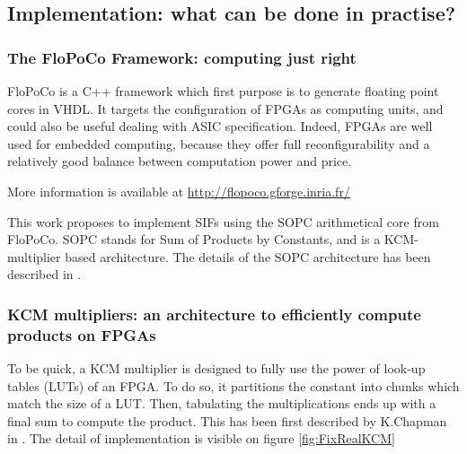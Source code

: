 	\subsection{Implementation: what can be done in practise?}

	\subsubsection{The FloPoCo Framework: computing just right}
		FloPoCo is a C++ framework \cite{DinechinPasca2011-DaT} which first purpose is to generate floating point cores in VHDL.
		It targets the configuration of FPGAs as computing units, and could also be useful dealing with ASIC specification.
		Indeed, FPGAs are well used for embedded computing, because they offer full reconfigurability and a relatively good balance between computation power and price.

		More information is available at \url{http://flopoco.gforge.inria.fr/}

	This work proposes to implement SIFs using the SOPC arithmetical core from FloPoCo.
	SOPC stands for Sum of Products by Constants, and is a KCM-multiplier based architecture.
	The details of the SOPC architecture has been described in \cite{sums}.

	\subsubsection{KCM multipliers: an architecture to efficiently compute products on FPGAs}
	To be quick, a KCM multiplier is designed to fully use the power of look-up tables (LUTs) of an FPGA.
	To do so, it partitions the constant into chunks which match the size of a LUT.
	Then, tabulating the multiplications ends up with a final sum to compute the product.
	This has been first described by K.Chapman in \cite{Chapman93:edn}.
	The detail of implementation is visible on figure \ref{fig:FixRealKCM}

